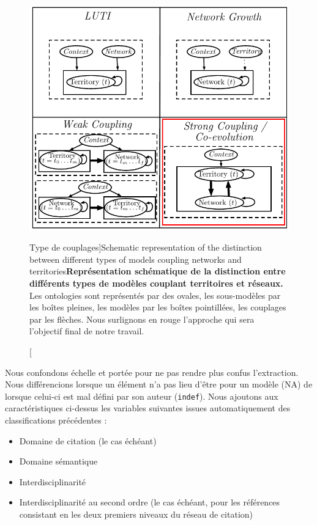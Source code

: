 \begin{figure}
\centering
\includegraphics[width=\textwidth]{Figures/Modelography/coevolution}
\caption[Coupling types][Type de couplages]{Schematic representation of the distinction between different types of models coupling networks and territories}{\textbf{Représentation schématique de la distinction entre différents types de modèles couplant territoires et réseaux.} Les ontologies sont représentés par des ovales, les sous-modèles par les boîtes pleines, les modèles par les boîtes pointillées, les couplages par les flèches. Nous surlignons en rouge l'approche qui sera l'objectif final de notre travail.}
\label{fig:modelography:coevolution}
\end{figure}


Nous confondons échelle et portée pour ne pas rendre plus confus l'extraction. Nous différencions lorsque un élément n'a pas lieu d'être pour un modèle (NA) de lorsque celui-ci est mal défini par son auteur (\texttt{indef}). Nous ajoutons aux caractéristiques ci-dessus les variables suivantes issues automatiquement des classifications précédentes :

\begin{itemize}
\item Domaine de citation (le cas échéant)
\item Domaine sémantique
\item Interdisciplinarité
\item Interdisciplinarité au second ordre (le cas échéant, pour les références consistant en les deux premiers niveaux du réseau de citation)
\end{itemize}



